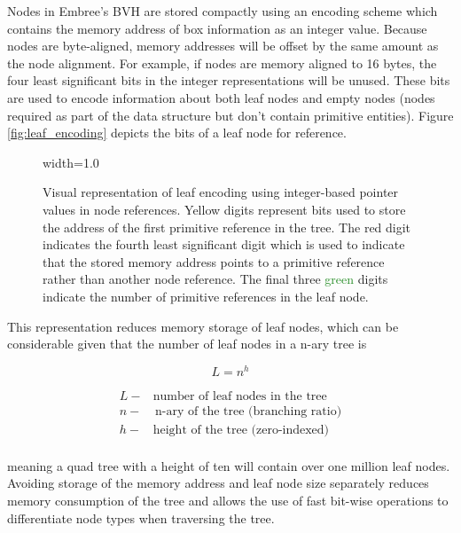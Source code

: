 Nodes in Embree's BVH are stored compactly using an encoding scheme which contains
the memory address of box information as an integer value. Because nodes are
byte-aligned, memory addresses will be offset by the same amount as the node
alignment. For example, if nodes are memory aligned to 16 bytes, the four least
significant bits in the integer representations will be unused. These bits are
used to encode information about both leaf nodes and empty nodes (nodes
required as part of the data structure but don't contain primitive entities). Figure
\ref{fig:leaf_encoding} depicts the bits of a leaf node for reference.

\begin{figure}[H]
  \centering
  {width=1.0\textwidth}
  \caption[Graphic of leaf node encoding.]{Visual representation of leaf
    encoding using integer-based pointer values in node references. \textcolor{Dandelion}{Yellow}
    digits represent bits used to store the address of the first primitive
    reference in the tree. The \textcolor{BrickRed}{red} digit indicates the fourth least significant
    digit which is used to indicate that the stored memory address points to a
    primitive reference rather than another node reference. The final three
    \textcolor{ForestGreen}{green} digits indicate the number of primitive references in the leaf node.}
  \label{fig:node_encoding}
\end{figure}

This representation reduces memory storage of leaf nodes, which can be
considerable given that the number of leaf nodes in a n-ary tree is

\begin{equation}
 L = n^{h} 
\end{equation}

\begin{align*}
   L - & \textrm{number of leaf nodes in the tree} \\
   n - & \, \textrm{n-ary  of  the  tree  (branching  ratio)} \\
   h - &  \textrm{height  of  the  tree  (zero-indexed)} \\
\end{align*}

meaning a quad tree with a height of ten will contain over one million leaf
nodes. Avoiding storage of the memory address and leaf node size separately
reduces memory consumption of the tree and allows the use of fast bit-wise
operations to differentiate node types when traversing the tree. 

